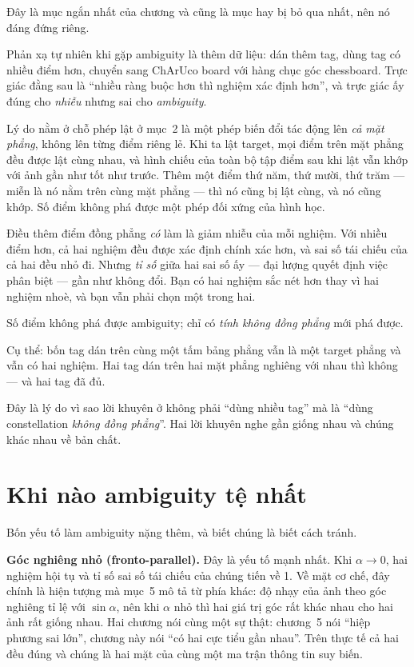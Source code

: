 \documentclass[../../marker.tex]{subfiles}
\begin{document}
Đây là mục ngắn nhất của chương và cũng là mục hay bị bỏ qua nhất, nên nó đáng đứng riêng.

Phản xạ tự nhiên khi gặp ambiguity là thêm dữ liệu: dán thêm tag, dùng tag có nhiều điểm hơn, chuyển sang ChArUco board với hàng chục góc chessboard. Trực giác đằng sau là ``nhiều ràng buộc hơn thì nghiệm xác định hơn'', và trực giác ấy đúng cho \emph{nhiễu} nhưng sai cho \emph{ambiguity}.

Lý do nằm ở chỗ phép lật ở mục~2 là một phép biến đổi tác động lên \emph{cả mặt phẳng}, không lên từng điểm riêng lẻ. Khi ta lật target, mọi điểm trên mặt phẳng đều được lật cùng nhau, và hình chiếu của toàn bộ tập điểm sau khi lật vẫn khớp với ảnh gần như tốt như trước. Thêm một điểm thứ năm, thứ mười, thứ trăm --- miễn là nó nằm trên cùng mặt phẳng --- thì nó cũng bị lật cùng, và nó cũng khớp. Số điểm không phá được một phép đối xứng của hình học.

Điều thêm điểm đồng phẳng \emph{có} làm là giảm nhiễu của mỗi nghiệm. Với nhiều điểm hơn, cả hai nghiệm đều được xác định chính xác hơn, và sai số tái chiếu của cả hai đều nhỏ đi. Nhưng \emph{tỉ số} giữa hai sai số ấy --- đại lượng quyết định việc phân biệt --- gần như không đổi. Bạn có hai nghiệm sắc nét hơn thay vì hai nghiệm nhoè, và bạn vẫn phải chọn một trong hai.

\begin{cannho}
Số điểm không phá được ambiguity; chỉ có \emph{tính không đồng phẳng} mới phá được.

Cụ thể: bốn tag dán trên cùng một tấm bảng phẳng vẫn là một target phẳng và vẫn có hai nghiệm. Hai tag dán trên hai mặt phẳng nghiêng với nhau thì không --- và hai tag đã đủ.

Đây là lý do vì sao lời khuyên ở  không phải ``dùng nhiều tag'' mà là ``dùng constellation \emph{không đồng phẳng}''. Hai lời khuyên nghe gần giống nhau và chúng khác nhau về bản chất.
\end{cannho}

\section{Khi nào ambiguity tệ nhất}

Bốn yếu tố làm ambiguity nặng thêm, và biết chúng là biết cách tránh.

\textbf{Góc nghiêng nhỏ (fronto-parallel).} Đây là yếu tố mạnh nhất. Khi \(\alpha \to 0\), hai nghiệm hội tụ và tỉ số sai số tái chiếu của chúng tiến về 1. Về mặt cơ chế, đây chính là hiện tượng mà  mục~5 mô tả từ phía khác: độ nhạy của ảnh theo góc nghiêng tỉ lệ với \(\sin\alpha\), nên khi \(\alpha\) nhỏ thì hai giá trị góc rất khác nhau cho hai ảnh rất giống nhau. Hai chương nói cùng một sự thật: chương~5 nói ``hiệp phương sai lớn'', chương này nói ``có hai cực tiểu gần nhau''. Trên thực tế cả hai đều đúng và chúng là hai mặt của cùng một ma trận thông tin suy biến.
\end{document}
